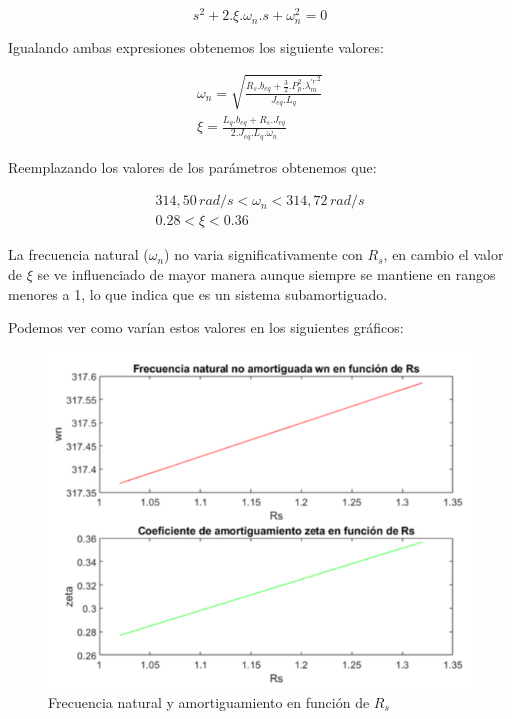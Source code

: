 \documentclass{article}
\begin{document}
\begin{equation}
    s^2 + 2.\xi.\omega_n.s + \omega_n^2 = 0
\end{equation}

Igualando ambas expresiones obtenemos los siguiente valores:

\begin{align*}
    \omega_n = \sqrt{\frac{R_s.b_{eq} + \frac{3}{2}.P_p^2.{\lambda_m^{\prime r}}^2}{J_{eq}.L_q}} \\
    \xi = \frac{L_q.b_{eq} + R_s.J_{eq}}{2.J_{eq}.L_q.\omega_n}
\end{align*}

Reemplazando los valores de los parámetros obtenemos que:

\begin{equation*}\begin{aligned}
    314,50\,rad/s < \omega_n < 314,72\,rad/s \\
    0.28 < \xi < 0.36 \quad\quad\quad\quad
\end{aligned}\end{equation*}

La frecuencia natural ($\omega_n$) no varia significativamente con $R_s$, en cambio el valor de $\xi$
se ve influenciado de mayor manera aunque siempre se mantiene en rangos menores a 1, lo que 
indica que es un sistema subamortiguado.

Podemos ver como varían estos valores en los siguientes gráficos:

\begin{figure}[H]
    \centering
    \includegraphics{frecuancia_amortiguamiento_rs.png}
    \caption{Frecuencia natural y amortiguamiento en función de $R_s$}
\end{figure}
\end{document}
